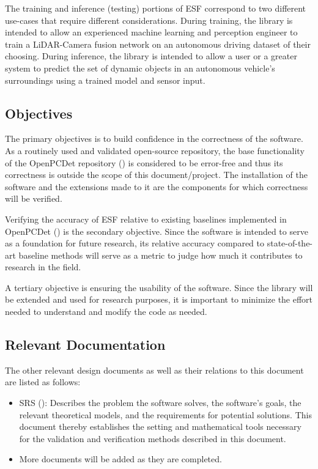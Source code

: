 \documentclass[12pt, titlepage]{article}
\newcommand{\ProjectName}{ESF }
\begin{document}
The training and inference (testing) portions of \ProjectName{}correspond to two different use-cases 
that require different considerations. During training, the library is intended to allow an experienced
machine learning and perception engineer to train a LiDAR-Camera fusion network on an autonomous driving 
dataset of their choosing. During inference, the library is intended to allow a user or a greater system 
to predict the set of dynamic objects in an autonomous vehicle's surroundings using a trained model and 
sensor input.

\subsection{Objectives}

The primary objectives is to build confidence in the correctness of the software.
As a routinely used and validated open-source repository, the base functionality of the OpenPCDet
repository (\cite{openpcdet2020}) is considered to be error-free and thus its correctness is outside the scope of this document/project.
The installation of the software and the extensions made to it are the components for which correctness will be 
verified. 

Verifying the accuracy of \ProjectName{}relative to existing baselines implemented in 
OpenPCDet (\cite{openpcdet2020}) is the secondary objective. Since the software is intended to serve as a foundation
for future research, its relative accuracy compared to state-of-the-art baseline methods will serve 
as a metric to judge how much it contributes to research in the field.

A tertiary objective is ensuring the usability of the software. Since the library will be extended and
used for research purposes, it is important to minimize the effort needed to understand and modify the code
as needed. 

\subsection{Relevant Documentation}

The other relevant design documents as well as their relations to this document are listed as follows:

\begin{itemize}
  \item SRS (\cite{SRS}): Describes the problem the software solves, the software's goals, 
  the relevant theoretical models, and the requirements for potential solutions. This document 
  thereby establishes the setting and mathematical tools necessary for the validation and verification
  methods described in this document.
  \item More documents will be added as they are completed.
\end{itemize}
\end{document}
